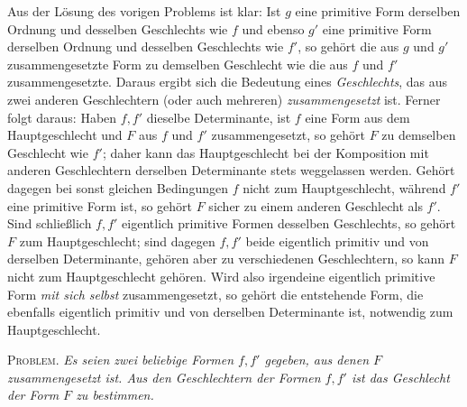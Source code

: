 Aus der Lösung des vorigen Problems ist klar: Ist $g$ eine primitive Form derselben Ordnung und desselben Geschlechts wie $f$ und ebenso $g'$ eine primitive Form derselben Ordnung und desselben Geschlechts wie $f'$, so gehört die aus $g$ und $g'$ zusammengesetzte Form zu demselben Geschlecht wie die aus $f$ und $f'$ zusammengesetzte. Daraus ergibt sich die Bedeutung eines \textit{Geschlechts},
das aus zwei anderen Geschlechtern (oder auch mehreren) \textit{zusammengesetzt} ist. Ferner folgt daraus: Haben $f,f'$ dieselbe Determinante, ist $f$ eine Form aus dem Hauptgeschlecht und $F$ aus $f$ und $f'$ zusammengesetzt, so gehört $F$ zu demselben Geschlecht wie $f'$; daher kann das Hauptgeschlecht bei der Komposition mit anderen Geschlechtern derselben Determinante stets weggelassen werden. Gehört dagegen bei sonst gleichen Bedingungen $f$ nicht zum Hauptgeschlecht, während $f'$ eine primitive Form ist, so gehört $F$ sicher zu einem anderen Geschlecht als $f'$. Sind schließlich $f,f'$ eigentlich primitive Formen desselben Geschlechts, so gehört $F$ zum Hauptgeschlecht; sind dagegen $f,f'$ beide eigentlich primitiv und von derselben Determinante, gehören aber zu verschiedenen Geschlechtern, so kann $F$ nicht zum Hauptgeschlecht gehören. Wird also irgendeine eigentlich primitive Form \textit{mit sich selbst} zusammengesetzt, so gehört die entstehende Form, die ebenfalls eigentlich primitiv und von derselben Determinante ist, notwendig zum Hauptgeschlecht.

\textsc{Problem.} \textit{Es seien zwei beliebige Formen $f,f'$ gegeben, aus denen $F$ zusammengesetzt ist. Aus den Geschlechtern der Formen $f,f'$ ist das Geschlecht der Form $F$ zu bestimmen.}

